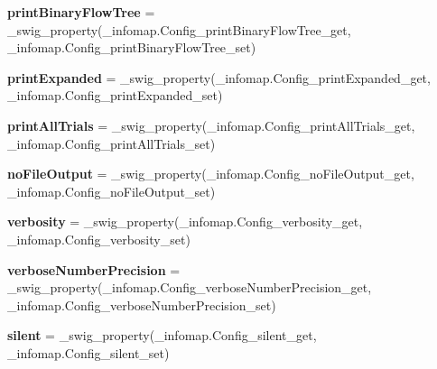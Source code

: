 \begin{DoxyCompactItemize}
\item 
\mbox{\label{classinfomap_1_1Config_aa387bfa622bd041ff8b0a7d388f3dce7}} 
{\bfseries print\+Binary\+Flow\+Tree} = \+\_\+swig\+\_\+property(\+\_\+infomap.\+Config\+\_\+print\+Binary\+Flow\+Tree\+\_\+get, \+\_\+infomap.\+Config\+\_\+print\+Binary\+Flow\+Tree\+\_\+set)
\item 
\mbox{\label{classinfomap_1_1Config_a50c2d10eccc43733d3000784753a1c75}} 
{\bfseries print\+Expanded} = \+\_\+swig\+\_\+property(\+\_\+infomap.\+Config\+\_\+print\+Expanded\+\_\+get, \+\_\+infomap.\+Config\+\_\+print\+Expanded\+\_\+set)
\item 
\mbox{\label{classinfomap_1_1Config_a7b8c9ce4c426fcfb005fa4290bc8c3f4}} 
{\bfseries print\+All\+Trials} = \+\_\+swig\+\_\+property(\+\_\+infomap.\+Config\+\_\+print\+All\+Trials\+\_\+get, \+\_\+infomap.\+Config\+\_\+print\+All\+Trials\+\_\+set)
\item 
\mbox{\label{classinfomap_1_1Config_a485e9be600252b875d905b00e1e411ce}} 
{\bfseries no\+File\+Output} = \+\_\+swig\+\_\+property(\+\_\+infomap.\+Config\+\_\+no\+File\+Output\+\_\+get, \+\_\+infomap.\+Config\+\_\+no\+File\+Output\+\_\+set)
\item 
\mbox{\label{classinfomap_1_1Config_a823e1d4360fa61a679c65aef473d3de9}} 
{\bfseries verbosity} = \+\_\+swig\+\_\+property(\+\_\+infomap.\+Config\+\_\+verbosity\+\_\+get, \+\_\+infomap.\+Config\+\_\+verbosity\+\_\+set)
\item 
\mbox{\label{classinfomap_1_1Config_a41faeb664540209d6cfb57d2bae916a4}} 
{\bfseries verbose\+Number\+Precision} = \+\_\+swig\+\_\+property(\+\_\+infomap.\+Config\+\_\+verbose\+Number\+Precision\+\_\+get, \+\_\+infomap.\+Config\+\_\+verbose\+Number\+Precision\+\_\+set)
\item 
\mbox{\label{classinfomap_1_1Config_aad3683b011f826d6bc1db69148c331c7}} 
{\bfseries silent} = \+\_\+swig\+\_\+property(\+\_\+infomap.\+Config\+\_\+silent\+\_\+get, \+\_\+infomap.\+Config\+\_\+silent\+\_\+set)
\item 
\mbox{\label{classinfomap_1_1Config_aa2625653262f512a5faf3aac2bf58476}} 

\end{DoxyCompactItemize}
